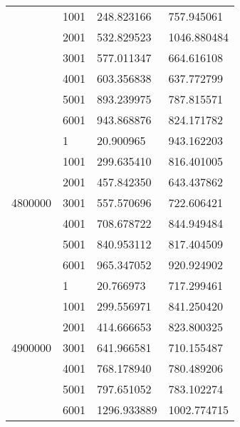 \begin{table}[htb!]
\begin{tabular}{llll}
 & 1001 & 248.823166 & 757.945061 \\
 & 2001 & 532.829523 & 1046.880484 \\
 & 3001 & 577.011347 & 664.616108 \\
 & 4001 & 603.356838 & 637.772799 \\
 & 5001 & 893.239975 & 787.815571 \\
 & 6001 & 943.868876 & 824.171782 \\
\multirow[c]{7}{*}{4800000} & 1 & 20.900965 & 943.162203 \\
 & 1001 & 299.635410 & 816.401005 \\
 & 2001 & 457.842350 & 643.437862 \\
 & 3001 & 557.570696 & 722.606421 \\
 & 4001 & 708.678722 & 844.949484 \\
 & 5001 & 840.953112 & 817.404509 \\
 & 6001 & 965.347052 & 920.924902 \\
\multirow[c]{7}{*}{4900000} & 1 & 20.766973 & 717.299461 \\
 & 1001 & 299.556971 & 841.250420 \\
 & 2001 & 414.666653 & 823.800325 \\
 & 3001 & 641.966581 & 710.155487 \\
 & 4001 & 768.178940 & 780.489206 \\
 & 5001 & 797.651052 & 783.102274 \\
 & 6001 & 1296.933889 & 1002.774715 \\
\bottomrule
\end{tabular}
\end{table}

